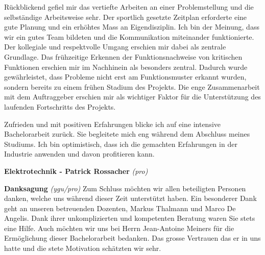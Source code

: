 Rückblickend gefiel mir das vertiefte Arbeiten an einer Problemstellung und die selbständige Arbeitsweise sehr. Der sportlich gesetzte Zeitplan erforderte eine gute Planung und ein erhöhtes Mass an Eigendisziplin. Ich bin der Meinung, dass wir ein gutes Team bildeten und die Kommunikation miteinander funktionierte. Der kollegiale und respektvolle Umgang erschien mir dabei als zentrale Grundlage. Das frühzeitige Erkennen der Funktionsnachweise von kritischen Funktionen erschien mir im Nachhinein als besonders zentral. Dadurch wurde gewährleistet, dass Probleme nicht erst am Funktionsmuster erkannt wurden, sondern bereits zu einem frühen Stadium des Projekts. Die enge Zusammenarbeit mit dem Auftraggeber erschien mir als wichtiger Faktor für die Unterstützung des laufenden Fortschritts des Projekts.
\newline

Zufrieden und mit positiven Erfahrungen blicke ich auf eine intensive Bachelorarbeit zurück. Sie begleitete mich eng während dem Abschluss meines Studiums. Ich bin optimistisch, dass ich die gemachten Erfahrungen in der Industrie anwenden und davon profitieren kann.
\newline

\textbf{Elektrotechnik - Patrick Rossacher}
\newline
\textit{(pro)}
\newline	

\textbf{Danksagung}
\newline
\textit{(ygu/pro)} Zum Schluss möchten wir allen beteiligten Personen danken, welche uns während dieser Zeit unterstützt haben. Ein besonderer Dank geht an unseren betreuenden Dozenten, Markus Thalmann und Marco De Angelis. Dank ihrer unkomplizierten und kompetenten Beratung waren Sie stets eine Hilfe. Auch möchten wir uns bei Herrn Jean-Antoine Meiners für die Ermöglichung dieser Bachelorarbeit bedanken. Das grosse Vertrauen das er in uns hatte und die stete Motivation schätzten wir sehr.

